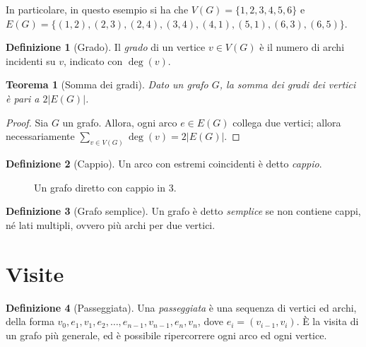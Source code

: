 \documentclass[14pt]{extreport}
\newtheorem{theorem}{Teorema}[section]
\theoremstyle{definition}
\newtheorem{definition}{Definizione}[section]
\theoremstyle{definition}
\begin{document}
In particolare, in questo esempio si ha che $V(G) = \{1, 2, 3, 4, 5, 6\}$ e $E(G) = \{(1, 2), (2, 3), (2, 4), (3, 4), (4, 1), (5, 1), (6, 3), (6, 5)\}$.

\begin{definition}[Grado]
    Il \textit{grado} di un vertice $v \in V(G)$ è il numero di archi incidenti su $v$, indicato con $\deg(v)$.
\end{definition}

\begin{theorem}[Somma dei gradi]
    Dato un grafo $G$, la somma dei gradi dei vertici è pari a $2 |E(G)|$.
\end{theorem}

\begin{proof}
    Sia $G$ un grafo. Allora, ogni arco $e \in E(G)$ collega due vertici; allora necessariamente $\displaystyle \sum_{v \in V(G)}{\deg(v)} = 2 |E(G)|$.
\end{proof}

\begin{definition}[Cappio]
    Un arco con estremi coincidenti è detto \textit{cappio}.
\end{definition}

\begin{figure}[!htbp]
    \centering
    \caption{Un grafo diretto con cappio in 3.}
\end{figure}

\begin{definition}[Grafo semplice]
    Un grafo è detto \textit{semplice} se non contiene cappi, né lati multipli, ovvero più archi per due vertici.
\end{definition}

\section{Visite}

\begin{definition}[Passeggiata]
    Una \textit{passeggiata} è una sequenza di vertici ed archi, della forma $v_0, e_1, v_1, e_2, \ldots , e_{n - 1}, v_{n - 1}, e_n, v_n$, dove $e_i=(v_{i - 1}, v_i)$. È la visita di un grafo più generale, ed è possibile ripercorrere ogni arco ed ogni vertice.
\end{definition}
\end{document}
